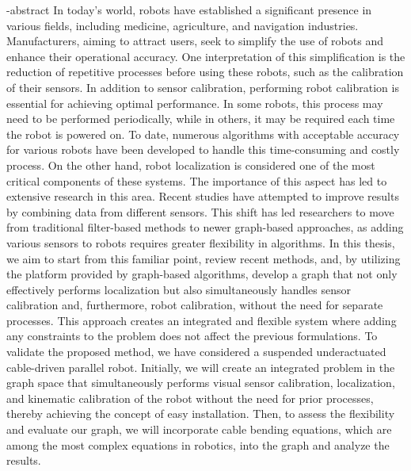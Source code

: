 
\en-abstract{
In today's world, robots have established a significant presence in various fields, including medicine, agriculture, and navigation industries. Manufacturers, aiming to attract users, seek to simplify the use of robots and enhance their operational accuracy. One interpretation of this simplification is the reduction of repetitive processes before using these robots, such as the calibration of their sensors. In addition to sensor calibration, performing robot calibration is essential for achieving optimal performance. In some robots, this process may need to be performed periodically, while in others, it may be required each time the robot is powered on.
To date, numerous algorithms with acceptable accuracy for various robots have been developed to handle this time-consuming and costly process. On the other hand, robot localization is considered one of the most critical components of these systems. The importance of this aspect has led to extensive research in this area. Recent studies have attempted to improve results by combining data from different sensors.
This shift has led researchers to move from traditional filter-based methods to newer graph-based approaches, as adding various sensors to robots requires greater flexibility in algorithms. In this thesis, we aim to start from this familiar point, review recent methods, and, by utilizing the platform provided by graph-based algorithms, develop a graph that not only effectively performs localization but also simultaneously handles sensor calibration and, furthermore, robot calibration, without the need for separate processes.
This approach creates an integrated and flexible system where adding any constraints to the problem does not affect the previous formulations. To validate the proposed method, we have considered a suspended underactuated cable-driven parallel robot. Initially, we will create an integrated problem in the graph space that simultaneously performs visual sensor calibration, localization, and kinematic calibration of the robot without the need for prior processes, thereby achieving the concept of easy installation. Then, to assess the flexibility and evaluate our graph, we will incorporate cable bending equations, which are among the most complex equations in robotics, into the graph and analyze the results. 
}
